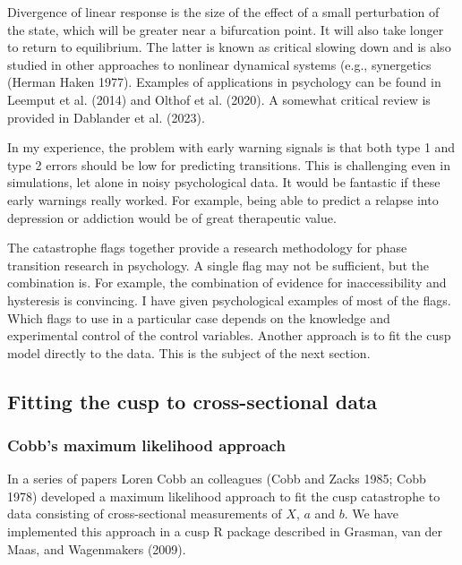 \documentclass[
  a4paper,
  DIV=11,
  numbers=noendperiod,
  oneside]{scrreprt}
\begin{document}
Divergence of linear response is the size of the effect of a small
perturbation of the state, which will be greater near a bifurcation
point. It will also take longer to return to equilibrium. The latter is
known as critical slowing down and is also studied in other approaches
to nonlinear dynamical systems (e.g., synergetics (Herman Haken 1977).
Examples of applications in psychology can be found in Leemput et al.
(2014) and Olthof et al. (2020). A somewhat critical review is provided
in Dablander et al. (2023).

In my experience, the problem with early warning signals is that both
type 1 and type 2 errors should be low for predicting transitions. This
is challenging even in simulations, let alone in noisy psychological
data. It would be fantastic if these early warnings really worked. For
example, being able to predict a relapse into depression or addiction
would be of great therapeutic value.

The catastrophe flags together provide a research methodology for phase
transition research in psychology. A single flag may not be sufficient,
but the combination is. For example, the combination of evidence for
inaccessibility and hysteresis is convincing. I have given psychological
examples of most of the flags. Which flags to use in a particular case
depends on the knowledge and experimental control of the control
variables. Another approach is to fit the cusp model directly to the
data. This is the subject of the next section.

\hypertarget{sec-Fitting-the-cusp-to-crosssectional-data}{%
\subsection{Fitting the cusp to cross-sectional
data}\label{sec-Fitting-the-cusp-to-crosssectional-data}}

\hypertarget{sec-Cobbs-maximum-likelihood-approach}{%
\subsubsection{Cobb's maximum likelihood
approach}\label{sec-Cobbs-maximum-likelihood-approach}}

In a series of papers Loren Cobb an colleagues (Cobb and Zacks 1985;
Cobb 1978) developed a maximum likelihood approach to fit the cusp
catastrophe to data consisting of cross-sectional measurements of \(X\),
\(a\) and \(b\). We have implemented this approach in a cusp R package
described in Grasman, van der Maas, and Wagenmakers (2009).
\end{document}
